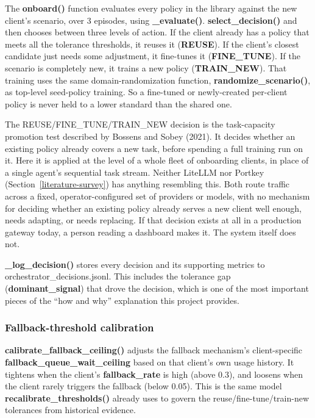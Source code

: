 The \textbf{onboard()} function evaluates every policy in the library
against the new client's scenario, over 3 episodes, using
\textbf{\_evaluate()}. \textbf{select\_decision()} and then chooses between
three levels of action. If the client already has a policy that meets
all the tolerance thresholds, it reuses it (\textbf{REUSE}). If the
client's closest candidate just needs some adjustment, it fine-tunes it
(\textbf{FINE\_TUNE}). If the scenario is completely new, it trains a
new policy (\textbf{TRAIN\_NEW}). That training uses the same
domain-randomization function, \textbf{randomize\_scenario()}, as
top-level seed-policy training. So a fine-tuned or newly-created
per-client policy is never held to a lower standard than the shared
one.

The REUSE/FINE\_TUNE/TRAIN\_NEW decision is the task-capacity promotion
test described by Bossens and Sobey (2021). It decides whether an
existing policy already covers a new task, before spending a full
training run on it. Here it is applied at the level of a whole fleet of
onboarding clients, in place of a single agent's sequential task
stream. Neither LiteLLM nor Portkey (Section~\ref{literature-survey}) has anything resembling
this. Both route traffic across a fixed, operator-configured set of
providers or models, with no mechanism for deciding whether an existing
policy already serves a new client well enough, needs adapting, or
needs replacing. If that decision exists at all in a production gateway
today, a person reading a dashboard makes it. The system itself does
not.

\textbf{\_log\_decision()} stores every decision and its supporting
metrics to orchestrator\_decisions.jsonl. This includes the tolerance
gap (\textbf{dominant\_signal}) that drove the decision, which is one
of the most important pieces of the ``how and why'' explanation this
project provides.

\hypertarget{fallback-threshold-calibration}{%
\subsubsection{Fallback-threshold
calibration}\label{fallback-threshold-calibration}}

\textbf{calibrate\_fallback\_ceiling()} adjusts the fallback
mechanism's client-specific \textbf{fallback\_queue\_wait\_ceiling}
based on that client's own usage history. It tightens when the
client's \textbf{fallback\_rate} is high (above 0.3), and loosens when
the client rarely triggers the fallback (below 0.05). This is the same
model \textbf{recalibrate\_thresholds()} already uses to govern the
reuse/fine-tune/train-new tolerances from historical evidence.

